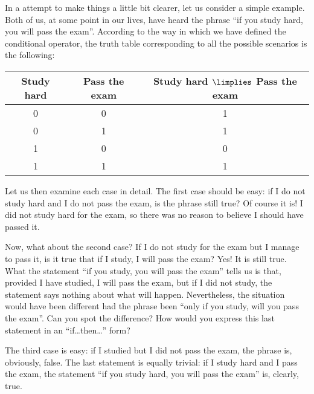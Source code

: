 \begin{example}
In a attempt to make things a little bit clearer, let us consider a simple example.
Both of us, at some point in our lives, have heard the phrase ``if you study hard, you will pass the exam''. According to the way in which we have defined the conditional operator, the truth table corresponding to all the possible scenarios is the following:
\begin{center}
\begin{tabular}[]{|c|c||c|}
\hline Study hard & Pass the exam & Study hard $\limplies$ Pass the exam \\
\hline\hline 0 & 0 & 1 \\
\hline 0 & 1 & 1 \\
\hline 1 & 0 & 0 \\
\hline 1 & 1 & 1 \\
\hline
\end{tabular}
\end{center}
Let us then examine each case in detail. The first case should be easy: if I do not study hard and I do not pass the exam, is the phrase still true? Of course it is! I did not study hard for the exam, so there was no reason to believe I should have passed it.

Now, what about the second case? If I do not study for the exam but I manage to pass it, is it true that if I study, I will pass the exam? Yes! It is still true. What the statement ``if you study, you will pass the exam'' tells us is that, provided I have studied, I will pass the exam, but if I did not study, the statement says nothing about what will happen. Nevertheless, the situation would have been different had the phrase been ``only if you study, will you pass the exam''. Can you spot the difference? How would you express this last statement in an ``if\ldots then\ldots'' form?

The third case is easy: if I studied but I did not pass the exam, the phrase is, obviously, false. The last statement is equally trivial: if I study hard and I pass the exam, the statement ``if you study hard, you will pass the exam'' is, clearly, true. 
\end{example}

